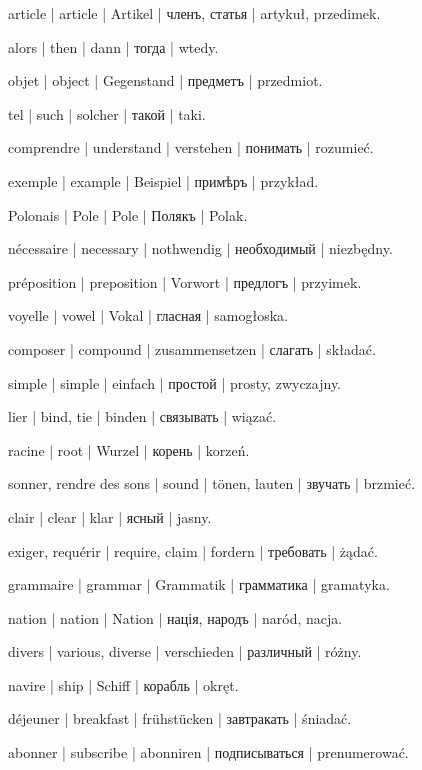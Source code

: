 \begin{ekzvocab}{1em}
 article | article | Artikel | членъ, статья | artykuł, przedimek.

 alors | then | dann | тогда | wtedy.

 objet | object | Gegenstand | предметъ | przedmiot.

 tel | such | solcher | такой | taki.

 comprendre | understand | verstehen | понимать | rozumieć.

 exemple | example | Beispiel | примѣръ | przykład.

 Polonais | Pole | Pole | Полякъ | Polak.

 nécessaire | necessary | nothwendig | необходимый | niezbędny.

 préposition | preposition | Vorwort | предлогъ | przyimek.

 voyelle | vowel | Vokal | гласная | samogłoska.

 composer | compound | zusammensetzen | слагать | składać.

 simple | simple | einfach | простой | prosty, zwyczajny.

 lier | bind, tie | binden | связывать | wiązać.

 racine | root | Wurzel | корень | korzeń.

 sonner, rendre des sons | sound | tönen, lauten | звучать | brzmieć.

 clair | clear | klar | ясный | jasny.

 exiger, requérir | require, claim | fordern | требовать | żądać.

 grammaire | grammar | Grammatik | грамматика | gramatyka.

 nation | nation | Nation | нація, народъ | naród, nacja.

 divers | various, diverse | verschieden | различный | różny.

 navire | ship | Schiff | корабль | okręt.

 déjeuner | breakfast | frühstücken | завтракать | śniadać.

 abonner | subscribe | abonniren | подписываться | prenumerować.

\end{ekzvocab}


